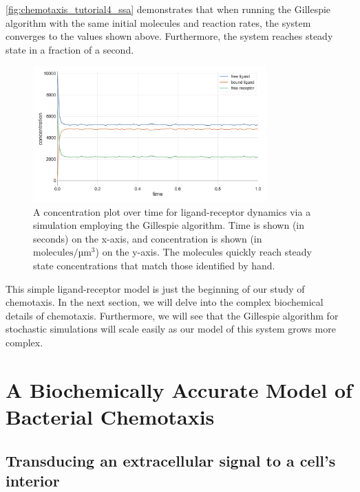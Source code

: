 \autoref{fig:chemotaxis_tutorial4_ssa} demonstrates that when running the Gillespie algorithm with the same initial molecules and reaction rates, the system converges to the values shown above. Furthermore, the system reaches steady state in a fraction of a second.\\

\begin{figure}[h]
\centering
\mySfFamily
\includegraphics[width = 0.8\textwidth]{../images/chemotaxis_tutorial4_ssa_vscode.png}
\caption{A concentration plot over time for ligand-receptor dynamics via a simulation employing the Gillespie algorithm. Time is shown (in seconds) on the x-axis, and concentration is shown (in $\text{molecules}/\text{µm}^\text{3}$) on the y-axis. The molecules quickly reach steady state concentrations that match those identified by hand.}
\label{fig:chemotaxis_tutorial4_ssa}
\end{figure}

This simple ligand-receptor model is just the beginning of our study of chemotaxis. In the next section, we will delve into the complex biochemical details of chemotaxis. Furthermore, we will see that the Gillespie algorithm for stochastic simulations will scale easily as our model of this system grows more complex.\\

\FloatBarrier
{}

\section{A Biochemically Accurate Model of Bacterial Chemotaxis}
\label{sec:a_biochemically_accurate_model_of_bacterial_chemotaxis}

\subsection{Transducing an extracellular signal to a cell's interior}

